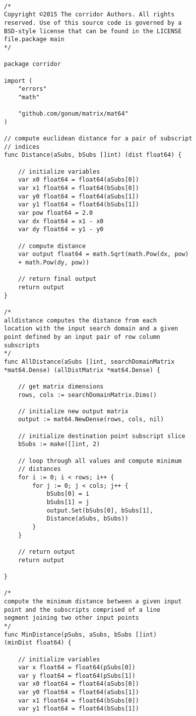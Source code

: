 \begin{lstlisting}[basicstyle=\small]

/* 
Copyright ©2015 The corridor Authors. All rights 
reserved. Use of this source code is governed by a 
BSD-style license that can be found in the LICENSE 
file.package main
*/

package corridor

import (
	"errors"
	"math"

	"github.com/gonum/matrix/mat64"
)

// compute euclidean distance for a pair of subscript 
// indices
func Distance(aSubs, bSubs []int) (dist float64) {

	// initialize variables
	var x0 float64 = float64(aSubs[0])
	var x1 float64 = float64(bSubs[0])
	var y0 float64 = float64(aSubs[1])
	var y1 float64 = float64(bSubs[1])
	var pow float64 = 2.0
	var dx float64 = x1 - x0
	var dy float64 = y1 - y0

	// compute distance
	var output float64 = math.Sqrt(math.Pow(dx, pow) 
	+ math.Pow(dy, pow))

	// return final output
	return output
}

/* 
alldistance computes the distance from each 
location with the input search domain and a given 
point defined by an input pair of row column 
subscripts
*/
func AllDistance(aSubs []int, searchDomainMatrix 
*mat64.Dense) (allDistMatrix *mat64.Dense) {
	
	// get matrix dimensions
	rows, cols := searchDomainMatrix.Dims()

	// initialize new output matrix
	output := mat64.NewDense(rows, cols, nil)

	// initialize destination point subscript slice
	bSubs := make([]int, 2)

	// loop through all values and compute minimum 
	// distances
	for i := 0; i < rows; i++ {
		for j := 0; j < cols; j++ {
			bSubs[0] = i
			bSubs[1] = j
			output.Set(bSubs[0], bSubs[1], 
			Distance(aSubs, bSubs))
		}
	}

	// return output
	return output

}

/* 
compute the minimum distance between a given input 
point and the subscripts comprised of a line 
segment joining two other input points
*/
func MinDistance(pSubs, aSubs, bSubs []int) 
(minDist float64) {

	// initialize variables
	var x float64 = float64(pSubs[0])
	var y float64 = float64(pSubs[1])
	var x0 float64 = float64(aSubs[0])
	var y0 float64 = float64(aSubs[1])
	var x1 float64 = float64(bSubs[0])
	var y1 float64 = float64(bSubs[1])


\end{lstlisting}
